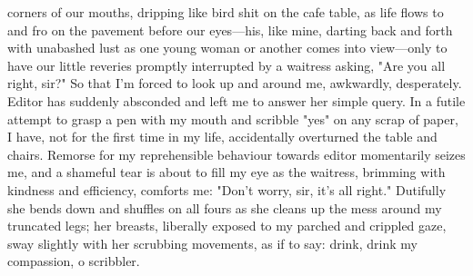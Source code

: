 \documentclass[
]{memoir}
\begin{document}
corners of our mouths, dripping like bird shit on the cafe table, as
life flows to and fro on the pavement before our eyes---his, like mine,
darting back and forth with unabashed lust as one young woman or another
comes into view---only to have our little reveries promptly interrupted
by a waitress asking, "Are you all right, sir?" So that I'm forced to
look up and around me, awkwardly, desperately. Editor has suddenly
absconded and left me to answer her simple query. In a futile attempt to
grasp a pen with my mouth and scribble "yes" on any scrap of paper, I
have, not for the first time in my life, accidentally overturned the
table and chairs. Remorse for my reprehensible behaviour towards editor
momentarily seizes me, and a shameful tear is about to fill my eye as
the waitress, brimming with kindness and efficiency, comforts me: "Don't
worry, sir, it's all right." Dutifully she bends down and shuffles on
all fours as she cleans up the mess around my truncated legs; her
breasts, liberally exposed to my parched and crippled gaze, sway
slightly with her scrubbing movements, as if to say: drink, drink my
compassion, o scribbler.
\end{document}
